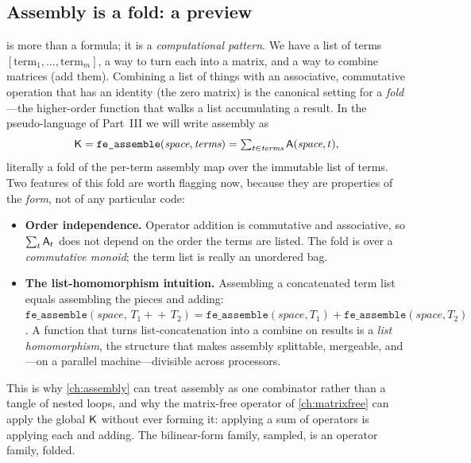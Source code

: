 \subsection{Assembly is a fold: a preview}

 is more than a formula; it is a \emph{computational
pattern}. We have a list of terms $[\text{term}_1,\dots,\text{term}_m]$, a way to
turn each into a matrix, and a way to combine matrices (add them). Combining a
list of things with an associative, commutative operation that has an identity
(the zero matrix) is the canonical setting for a \emph{fold}---the higher-order
function that walks a list accumulating a result. In the pseudo-language of
Part~III we will write assembly as
\begin{equation}
\mathsf{K}=\texttt{fe\_assemble}(\textit{space},\textit{terms})
=\textstyle\sum_{t\in\textit{terms}}\mathsf{A}(\textit{space},t),
\label{eq:fe-assemble}
\end{equation}
literally a fold of the per-term assembly map over the immutable list of terms.
Two features of this fold are worth flagging now, because they are properties of
the \emph{form}, not of any particular code:

\begin{itemize}[nosep]
\item \textbf{Order independence.} Operator addition is commutative and
associative, so $\sum_t\mathsf{A}_t$ does not depend on the order the terms are
listed. The fold is over a \emph{commutative monoid}; the term list is really an
unordered bag.
\item \textbf{The list-homomorphism intuition.} Assembling a concatenated term
list equals assembling the pieces and adding:
$\texttt{fe\_assemble}(\textit{space},\,T_1\!+\!\!+\,T_2)=
\texttt{fe\_assemble}(\textit{space},T_1)+\texttt{fe\_assemble}(\textit{space},T_2)$.
A function that turns list-concatenation into a combine on results is a
\emph{list homomorphism}, the structure that makes assembly splittable, mergeable,
and---on a parallel machine---divisible across processors.
\end{itemize}

This is why \cref{ch:assembly} can treat assembly as one combinator rather than a
tangle of nested loops, and why the matrix-free operator of \cref{ch:matrixfree}
can apply the global $\mathsf{K}$ without ever forming it: applying a sum of
operators is applying each and adding. The bilinear-form family, sampled, is an
operator family, folded.

